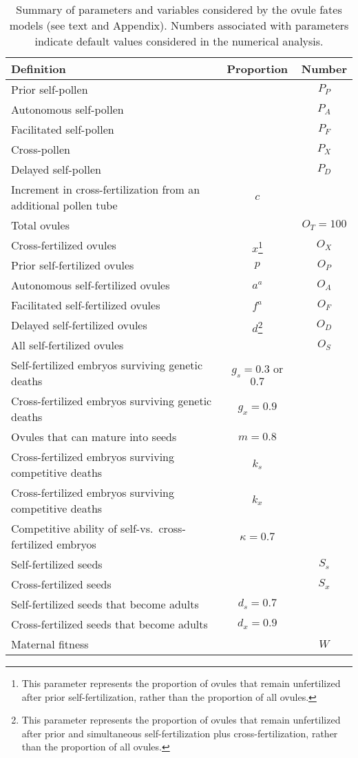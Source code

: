 \documentclass[letterpaper,titlepage]{scrartcl}
\begin{document}
\begin{table}[p]
\begin{minipage}{\textwidth}
  \begin{tabular}{lcc}
    \hline
    Definition & Proportion & Number\\
    \hline
    Prior self-pollen &  & $P_{P}$\\
    Autonomous self-pollen &  & $P_{A}$\\
    Facilitated self-pollen &  & $P_{F}$\\
    Cross-pollen &  & $P_{X}$\\
    Delayed self-pollen &  & $P_{D}$\\
    Increment in cross-fertilization from an additional pollen tube & $c$ & \\
    Total ovules &  & $O_{T}=100$\\
    Cross-fertilized ovules & $x$\footnote{This parameter represents the proportion of ovules that remain unfertilized after prior self-fertilization, rather than the proportion of all ovules.} & $O_{X}$\\
    Prior self-fertilized ovules & $p$ & $O_{P}$\\
    Autonomous self-fertilized ovules & $a^{a}$ & $O_{A}$\\
    Facilitated self-fertilized ovules & $f^{a}$ & $O_{F}$\\
    Delayed self-fertilized ovules & $d$\footnote{This parameter represents the proportion of ovules that remain unfertilized after prior and simultaneous self-fertilization plus cross-fertilization, rather than the proportion of all ovules.} & $O_{D}$\\
    All self-fertilized ovules & & $O_{S}$\\
    Self-fertilized embryos surviving genetic deaths & $g_{s}=0.3$ or $0.7$ & \\
    Cross-fertilized embryos surviving genetic deaths & $g_{x}=0.9$ & \\
    Ovules that can mature into seeds & $m=0.8$ & \\
    Cross-fertilized embryos surviving competitive deaths & $k_{s}$ & \\
    Cross-fertilized embryos surviving competitive deaths & $k_{x}$ & \\
    Competitive ability of self-vs.~cross-fertilized embryos & $\kappa =0.7$ & \\
    Self-fertilized seeds &  & $S_{s}$\\
    Cross-fertilized seeds &  & $S_{x}$\\
    Self-fertilized seeds that become adults & $d_{s}=0.7$ & \\
    Cross-fertilized seeds that become adults & $d_{x}=0.9$ & \\
    Maternal fitness &  & $W$\\
    \hline
  \end{tabular}
  \caption{Summary of parameters and variables considered by the ovule fates models (see text and Appendix).  Numbers associated with parameters indicate default values considered in the numerical analysis.}
  \label{table:symbols}
\end{minipage}
\end{table}
\end{document}
